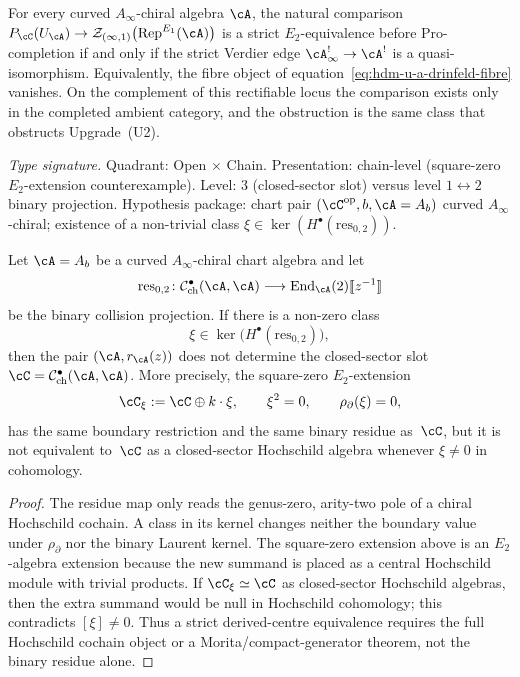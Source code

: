 \begin{conjecture}
\label{conj:hdm-u-a-drinfeld-center-strict-off-locus}
\ClaimStatusConjectured
For every curved $A_\infty$-chiral algebra $\cA$, the natural comparison
$P_\cC(U_\cA) \to
\mathcal Z_{(\infty,1)}\bigl(\mathrm{Rep}^{E_1}(\cA)\bigr)$ is a
strict $E_2$-equivalence before $\mathrm{Pro}$-completion if and only
if the strict Verdier edge $\cA^{!}_\infty\to\cA^!$ is a
quasi-isomorphism. Equivalently, the fibre object of
equation~\eqref{eq:hdm-u-a-drinfeld-fibre} vanishes. On the complement
of this rectifiable locus the comparison exists only in the completed
ambient category, and the obstruction is the same class that obstructs
Upgrade~\textup{(U2)}.
\end{conjecture}

\begin{proposition}
\label{prop:hdm-binary-residue-not-bulk}
\emph{Type signature.} Quadrant: Open $\times$ Chain. Presentation:
chain-level (square-zero $E_2$-extension counterexample). Level: $3$
(closed-sector slot) versus level $1\leftrightarrow 2$ binary
projection. Hypothesis package: chart pair
$(\cC^{\mathrm{op}}, b, \cA = A_b)$ curved $A_\infty$-chiral; existence
of a non-trivial class
$\xi\in\ker(H^\bullet(\mathrm{res}_{0,2}))$.

Let $\cA = A_b$ be a curved $A_\infty$-chiral chart algebra and let
\[
\mathrm{res}_{0,2}\colon
\mathcal C^\bullet_{\mathrm{ch}}(\cA,\cA)\longrightarrow
\mathrm{End}_\cA(2)[\![z^{-1}]\!]
\]
be the binary collision projection. If there is a non-zero class
\[
\xi\in
\ker\bigl(H^\bullet(\mathrm{res}_{0,2})\bigr),
\]
then the pair $(\cA,r_\cA(z))$ does not determine the closed-sector slot
$\cC=\mathcal C^\bullet_{\mathrm{ch}}(\cA,\cA)$. More precisely, the
square-zero $E_2$-extension
\[
\cC_\xi:=\cC\oplus k\cdot\xi,\qquad \xi^2=0,\qquad
\rho_\partial(\xi)=0,
\]
has the same boundary restriction and the same binary residue as~$\cC$,
but it is not equivalent to~$\cC$ as a closed-sector Hochschild
algebra whenever $\xi\neq 0$ in cohomology.
\end{proposition}

\begin{proof}
The residue map only reads the genus-zero, arity-two pole of a chiral
Hochschild cochain. A class in its kernel changes neither the boundary
value under $\rho_\partial$ nor the binary Laurent kernel. The
square-zero extension above is an $E_2$-algebra extension because the
new summand is placed as a central Hochschild module with trivial
products. If $\cC_\xi\simeq\cC$ as closed-sector Hochschild algebras, then the extra
summand would be null in Hochschild cohomology; this contradicts
$[\xi]\neq0$. Thus a strict derived-centre equivalence requires the
full Hochschild cochain object or a Morita/compact-generator theorem,
not the binary residue alone.
\end{proof}

